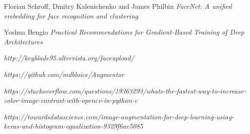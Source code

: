 \documentclass[10pt,twocolumn,letterpaper]{article}
\begin{document}
\begin{thebibliography}{9}

Florian Schroff, Dmitry Kalenichenko and James Philbin
\textit{FaceNet: A unified embedding for face recognition and clustering}.

Yoshua Bengio
\textit{Practical Recommendations for Gradient-Based Training of Deep
Architectures}

\textit{http://keyblade95.altervista.org/faceupload/}

\textit{https://github.com/mdbloice/Augmentor}

\textit{https://stackoverflow.com/questions/19363293/whats-the-fastest-way-to-increase-color-image-contrast-with-opencv-in-python-c}

\textit{https://towardsdatascience.com/image-augmentation-for-deep-learning-using-keras-and-histogram-equalization-9329f6ae5085}
\end{thebibliography}
\end{document}
